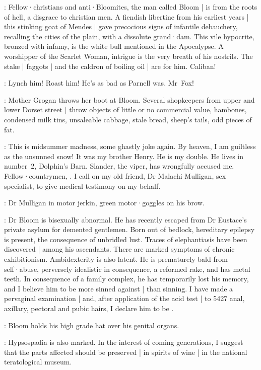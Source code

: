 \Dowie[1]:
Fellow·christians and anti·Bloomites,
the man called Bloom |
is from the roots of hell,
a disgrace to christian men.
A fiendish libertine from his earliest years |
this stinking goat of Mendes |
gave precocious signs of infantile debauchery,
recalling the cities of the plain,
with a dissolute grand·dam.
This vile hypocrite,
bronzed with infamy,
is the white bull mentioned in the Apocalypse.
A worshipper of the Scarlet Woman,
intrigue is the very breath of his nostrils.
The stake |
faggots |
and the caldron of boiling oil |
are for him.
Caliban!

\Mob[2]:
Lynch him!
Roast him!
He's as bad as Parnell was.
Mr~Fox!

:
Mother Grogan throws her boot at Bloom.
Several shopkeepers from upper and lower Dorset street |
throw objects of little or no commercial value,
hambones,
condensed milk tins,
unsaleable cabbage,
stale bread,
sheep's tails,
odd pieces of fat.

\Bloom:
This is midsummer madness,
some ghastly joke again.
By heaven,
I am guiltless as the unsunned snow!
It was my brother Henry.
He is my double.%
He lives in number~2,
Dolphin's Barn.
Slander,
the viper,
has wrongfully accused me.
Fellow·countrymen,
.
I call on my old friend,
Dr Malachi Mulligan,
sex specialist,
to give medical testimony on my behalf.

:
Dr Mulligan in motor jerkin,
green motor·goggles on his brow.

\DrMulligan:
Dr Bloom is bisexually abnormal.
He has recently escaped from Dr Eustace's private asylum for demented gentlemen.
Born out of bedlock,
hereditary epilepsy is present,
the consequence of unbridled lust.
Traces of elephantiasis have been discovered |
among his ascendants.
There are marked symptoms of chronic exhibitionism.
Ambidexterity is also latent.
He is prematurely bald from self·abuse,
perversely idealistic in consequence,
a reformed rake,
and has metal teeth.
In consequence of a family complex,
he has temporarily lost his memory,
and I believe him to be more sinned against |
than sinning.
I have made a pervaginal examination |
and,
after application of the acid test |
to 5427 anal,
axillary,
pectoral and pubic hairs,
I declare him to be .

:
Bloom holds his high grade hat over his genital organs.

\DrMadden[2]:
Hypsospadia is also marked.
In the interest of coming generations,
I suggest that the parts affected should be preserved |
in spirits of wine |
in the national teratological museum.


